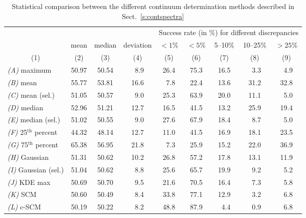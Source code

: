 \documentclass{aa}
\newcommand{\phn} {$\phantom{0}$}
\begin{document}
\begin{table*}
\caption{\label{t:statistics} Statistical comparison between the different continuum determination methods described in Sect.~\ref{s:contspectra}}
\centering
\begin{tabular}{l c c c c c c c c}
\hline\hline

&
&
&
&\multicolumn{5}{c}{Success rate (in \%) for different discrepancies}
\\
\cline{5-9}
\noalign{\smallskip}

\multicolumn{1}{c}{Continuum determination method}
&mean
&median
&deviation
&$<1$\%
&$<5$\%
&5--10\%
&10--25\%
&$>25$\%
\\
\multicolumn{1}{c}{(1)}
&(2)
&(3)
&(4)
&(5)
&(6)
&(7)
&(8)
&(9)
\\
\hline
\textit{(A)} maximum                  &50.97      &50.54      &\phn8.9   &26.4     &75.3     &16.5    &\phn3.3 &\phn4.9 \\
\textit{(B)} mean                     &55.77      &53.81      &16.6      &\phn7.8  &22.4     &13.6    &31.2    &32.8 \\
\textit{(C)} mean (sel.)              &51.05      &50.57      &\phn9.0   &25.3     &63.9     &20.0    &11.1    &\phn5.0 \\
\textit{(D)} median                   &52.96      &51.21      &12.7      &16.5     &41.5     &13.2    &25.9    &19.4 \\
\textit{(E)} median (sel.)            &51.02      &50.55      &\phn9.0   &27.6     &67.9     &18.4    &\phn8.7 &\phn5.0 \\
\textit{(F)} 25$^\mathrm{th}$ percent &44.32      &48.14      &12.7      &11.0     &41.5     &16.9    &18.1    &23.5 \\
\textit{(G)} 75$^\mathrm{th}$ percent &65.38      &56.95      &21.8      &\phn7.3  &25.9     &15.2    &22.0    &36.9 \\
\textit{(H)} Gaussian                 &51.31      &50.62      &10.2      &26.8     &57.2     &17.8    &13.1    &11.9 \\
\textit{(I)} Gaussian (sel.)          &51.04      &50.62      &\phn8.8   &25.6     &65.7     &19.9    &\phn9.2 &\phn5.2 \\
\textit{(J)} KDE max                  &50.69      &50.70      &\phn9.5   &21.6     &70.5     &16.4    &\phn7.3 &\phn5.8 \\
\textit{(K)} SCM                      &50.60      &50.49      &\phn8.4   &33.8     &77.1     &12.9    &\phn3.2 &\phn6.8 \\
\textit{(L)} c-SCM                    &50.19      &50.22      &\phn8.2   &48.8     &87.9     &\phn4.4 &\phn0.9 &\phn6.8 \\
\hline
\end{tabular}
\end{table*}
\end{document}
